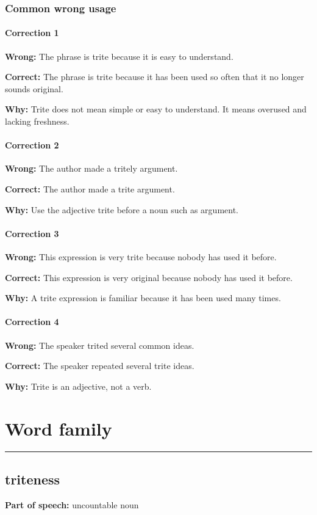 \documentclass[11pt]{article}
\newcommand{\sectionrule}{\par\vspace{-0.5em}\noindent\textcolor{Accent}{\rule{\linewidth}{0.6pt}}\par}
\begin{document}
\subsubsection{Common wrong usage}
\paragraph{Correction 1}
\textbf{Wrong:} The phrase is trite because it is easy to understand.

\textbf{Correct:} The phrase is trite because it has been used so often that it no longer sounds original.

\textbf{Why:} Trite does not mean simple or easy to understand. It means overused and lacking freshness.

\paragraph{Correction 2}
\textbf{Wrong:} The author made a tritely argument.

\textbf{Correct:} The author made a trite argument.

\textbf{Why:} Use the adjective trite before a noun such as argument.

\paragraph{Correction 3}
\textbf{Wrong:} This expression is very trite because nobody has used it before.

\textbf{Correct:} This expression is very original because nobody has used it before.

\textbf{Why:} A trite expression is familiar because it has been used many times.

\paragraph{Correction 4}
\textbf{Wrong:} The speaker trited several common ideas.

\textbf{Correct:} The speaker repeated several trite ideas.

\textbf{Why:} Trite is an adjective, not a verb.

\section{Word family}
\sectionrule
\subsection{triteness}
\textbf{Part of speech:} uncountable noun
\end{document}
